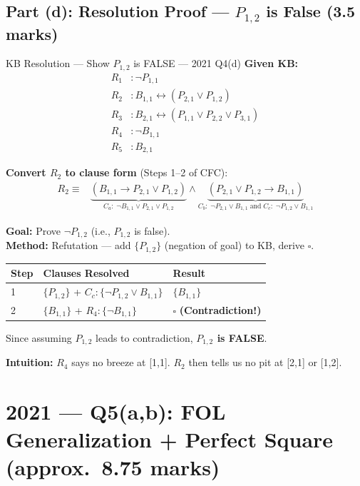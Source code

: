 \documentclass[12pt,a4paper]{article}
\newcommand{\ra}{\rightarrow}
\newcommand{\lra}{\leftrightarrow}
\newcommand{\cl}[1]{\{#1\}}      %
\begin{document}
\subsection{Part (d): Resolution Proof --- $P_{1,2}$ is False (3.5 marks)}

\begin{solbox}{KB Resolution --- Show $P_{1,2}$ is FALSE --- 2021 Q4(d)}
\textbf{Given KB:}
\begin{align*}
  R_1&: \neg P_{1,1} \\
  R_2&: B_{1,1} \lra (P_{2,1} \lor P_{1,2})\\
  R_3&: B_{2,1} \lra (P_{1,1} \lor P_{2,2} \lor P_{3,1})\\
  R_4&: \neg B_{1,1}\\
  R_5&: B_{2,1}
\end{align*}

\textbf{Convert $R_2$ to clause form} (Steps 1--2 of CFC):
\begin{align*}
  R_2 \equiv &\underbrace{(B_{1,1} \ra P_{2,1} \lor P_{1,2})}_{C_a:\;\neg B_{1,1} \lor P_{2,1} \lor P_{1,2}}
  \land
  \underbrace{(P_{2,1} \lor P_{1,2} \ra B_{1,1})}_{C_b:\;\neg P_{2,1} \lor B_{1,1}\;\text{and}\;C_c:\;\neg P_{1,2} \lor B_{1,1}}
\end{align*}

\textbf{Goal:} Prove $\neg P_{1,2}$ (i.e., $P_{1,2}$ is false).\\
\textbf{Method:} Refutation --- add $\cl{P_{1,2}}$ (negation of goal) to KB, derive $\square$.

\medskip
\begin{tabular}{@{}l@{\quad}l@{\quad}l@{}}
  \toprule
  \textbf{Step} & \textbf{Clauses Resolved} & \textbf{Result} \\
  \midrule
  1 & $\cl{P_{1,2}}$ + $C_c:\cl{\neg P_{1,2} \lor B_{1,1}}$ & $\cl{B_{1,1}}$ \\
  2 & $\cl{B_{1,1}}$ + $R_4:\cl{\neg B_{1,1}}$ & $\boxed{\square}$ \textbf{(Contradiction!)}\\
  \bottomrule
\end{tabular}

\medskip
Since assuming $P_{1,2}$ leads to contradiction, \textbf{$P_{1,2}$ is FALSE}. \checkmark

\medskip
\textbf{Intuition:} $R_4$ says no breeze at [1,1]. $R_2$ then tells us no pit at [2,1] or [1,2].
\end{solbox}

\newpage
\section{2021 --- Q5(a,b): FOL Generalization + Perfect Square (approx.\ 8.75 marks)}
\end{document}

